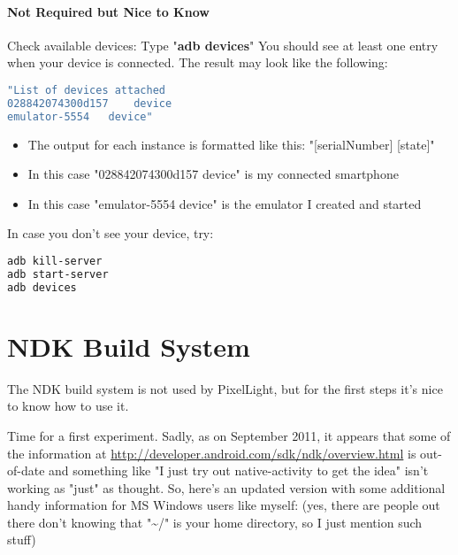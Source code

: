 \paragraph{Not Required but Nice to Know}
Check available devices: Type "\textbf{adb devices}" \textrightarrow{} You should see at least one entry when your device is connected. The result may look like the following:
\begin{lstlisting}[language=sh]
"List of devices attached
028842074300d157	device
emulator-5554	device"
\end{lstlisting}

\begin{itemize}
\item{The output for each instance is formatted like this: \textrightarrow{} "[serialNumber] [state]"}
\item{In this case "028842074300d157	device" is my connected smartphone}
\item{In this case "emulator-5554	device" is the emulator I created and started}
\end{itemize}

In case you don't see your device, try:
\begin{lstlisting}[language=sh]
adb kill-server
adb start-server
adb devices 
\end{lstlisting}




\section{\ac{NDK} Build System}
The \ac{NDK} build system is not used by PixelLight, but for the first steps it's nice to know how to use it.

Time for a first experiment. Sadly, as on September 2011, it appears that some of the information at \url{http://developer.android.com/sdk/ndk/overview.html} is out-of-date and something like "I just try out native-activity to get the idea" isn't working as "just" as thought. So, here's an updated version with some additional handy information for \ac{MS} Windows users like myself: (yes, there are people out there don't knowing that "\textasciitilde /" is your home directory, so I just mention such stuff)


